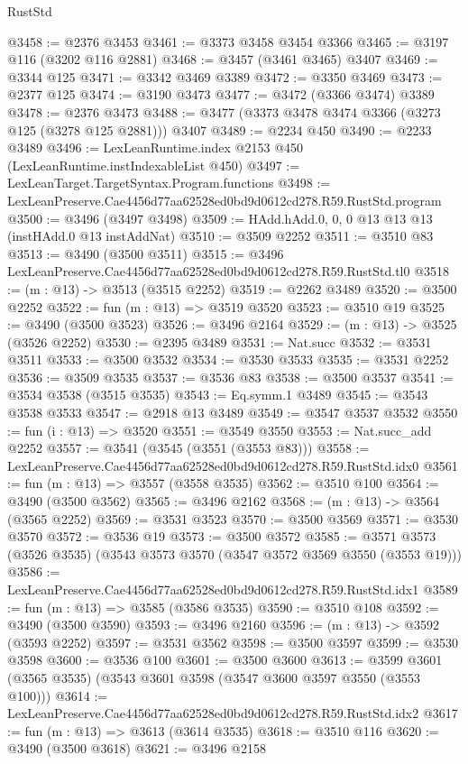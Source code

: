 \begin{lexlean}{RustStd}
\begin{coremodule}
@3458 := @2376 @3453
@3461 := @3373 @3458 @3454 @3366
@3465 := @3197 @116 (@3202 @116 @2881)
@3468 := @3457 (@3461 @3465) @3407
@3469 := @3344 @125
@3471 := @3342 @3469 @3389
@3472 := @3350 @3469
@3473 := @2377 @125
@3474 := @3190 @3473
@3477 := @3472 (@3366 @3474) @3389
@3478 := @2376 @3473
@3488 := @3477 (@3373 @3478 @3474 @3366 (@3273 @125 (@3278 @125 @2881))) @3407
@3489 := @2234 @450
@3490 := @2233 @3489
@3496 := LexLeanRuntime.index @2153 @450 (LexLeanRuntime.instIndexableList @450)
@3497 := LexLeanTarget.TargetSyntax.Program.functions
@3498 := LexLeanPreserve.Cae4456d77aa62528ed0bd9d0612cd278.R59.RustStd.program
@3500 := @3496 (@3497 @3498)
@3509 := HAdd.hAdd.{0, 0, 0} @13 @13 @13 (instHAdd.{0} @13 instAddNat)
@3510 := @3509 @2252
@3511 := @3510 @83
@3513 := @3490 (@3500 @3511)
@3515 := @3496 LexLeanPreserve.Cae4456d77aa62528ed0bd9d0612cd278.R59.RustStd.tl0
@3518 := (m : @13) -> @3513 (@3515 @2252)
@3519 := @2262 @3489
@3520 := @3500 @2252
@3522 := fun (m : @13) => @3519 @3520
@3523 := @3510 @19
@3525 := @3490 (@3500 @3523)
@3526 := @3496 @2164
@3529 := (m : @13) -> @3525 (@3526 @2252)
@3530 := @2395 @3489
@3531 := Nat.succ
@3532 := @3531 @3511
@3533 := @3500 @3532
@3534 := @3530 @3533
@3535 := @3531 @2252
@3536 := @3509 @3535
@3537 := @3536 @83
@3538 := @3500 @3537
@3541 := @3534 @3538 (@3515 @3535)
@3543 := Eq.symm.{1} @3489
@3545 := @3543 @3538 @3533
@3547 := @2918 @13 @3489
@3549 := @3547 @3537 @3532
@3550 := fun (i : @13) => @3520
@3551 := @3549 @3550
@3553 := Nat.succ_add @2252
@3557 := @3541 (@3545 (@3551 (@3553 @83)))
@3558 := LexLeanPreserve.Cae4456d77aa62528ed0bd9d0612cd278.R59.RustStd.idx0
@3561 := fun (m : @13) => @3557 (@3558 @3535)
@3562 := @3510 @100
@3564 := @3490 (@3500 @3562)
@3565 := @3496 @2162
@3568 := (m : @13) -> @3564 (@3565 @2252)
@3569 := @3531 @3523
@3570 := @3500 @3569
@3571 := @3530 @3570
@3572 := @3536 @19
@3573 := @3500 @3572
@3585 := @3571 @3573 (@3526 @3535) (@3543 @3573 @3570 (@3547 @3572 @3569 @3550 (@3553 @19)))
@3586 := LexLeanPreserve.Cae4456d77aa62528ed0bd9d0612cd278.R59.RustStd.idx1
@3589 := fun (m : @13) => @3585 (@3586 @3535)
@3590 := @3510 @108
@3592 := @3490 (@3500 @3590)
@3593 := @3496 @2160
@3596 := (m : @13) -> @3592 (@3593 @2252)
@3597 := @3531 @3562
@3598 := @3500 @3597
@3599 := @3530 @3598
@3600 := @3536 @100
@3601 := @3500 @3600
@3613 := @3599 @3601 (@3565 @3535) (@3543 @3601 @3598 (@3547 @3600 @3597 @3550 (@3553 @100)))
@3614 := LexLeanPreserve.Cae4456d77aa62528ed0bd9d0612cd278.R59.RustStd.idx2
@3617 := fun (m : @13) => @3613 (@3614 @3535)
@3618 := @3510 @116
@3620 := @3490 (@3500 @3618)
@3621 := @3496 @2158

\end{coremodule}
\end{lexlean}
